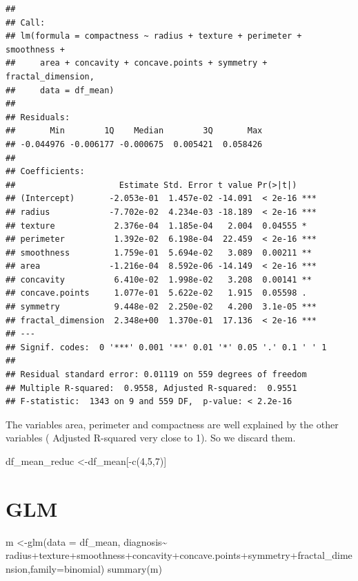 \documentclass[
  11pt,
]{article}
\newenvironment{Shaded}{\begin{snugshade}}{\end{snugshade}}
\newcommand{\AttributeTok}[1]{\textcolor[rgb]{0.77,0.63,0.00}{#1}}
\newcommand{\DecValTok}[1]{\textcolor[rgb]{0.00,0.00,0.81}{#1}}
\newcommand{\FunctionTok}[1]{\textcolor[rgb]{0.00,0.00,0.00}{#1}}
\newcommand{\NormalTok}[1]{#1}
\newcommand{\OtherTok}[1]{\textcolor[rgb]{0.56,0.35,0.01}{#1}}
\newcommand{\SpecialCharTok}[1]{\textcolor[rgb]{0.00,0.00,0.00}{#1}}
\begin{document}
\begin{verbatim}
## 
## Call:
## lm(formula = compactness ~ radius + texture + perimeter + smoothness + 
##     area + concavity + concave.points + symmetry + fractal_dimension, 
##     data = df_mean)
## 
## Residuals:
##       Min        1Q    Median        3Q       Max 
## -0.044976 -0.006177 -0.000675  0.005421  0.058426 
## 
## Coefficients:
##                     Estimate Std. Error t value Pr(>|t|)    
## (Intercept)       -2.053e-01  1.457e-02 -14.091  < 2e-16 ***
## radius            -7.702e-02  4.234e-03 -18.189  < 2e-16 ***
## texture            2.376e-04  1.185e-04   2.004  0.04555 *  
## perimeter          1.392e-02  6.198e-04  22.459  < 2e-16 ***
## smoothness         1.759e-01  5.694e-02   3.089  0.00211 ** 
## area              -1.216e-04  8.592e-06 -14.149  < 2e-16 ***
## concavity          6.410e-02  1.998e-02   3.208  0.00141 ** 
## concave.points     1.077e-01  5.622e-02   1.915  0.05598 .  
## symmetry           9.448e-02  2.250e-02   4.200  3.1e-05 ***
## fractal_dimension  2.348e+00  1.370e-01  17.136  < 2e-16 ***
## ---
## Signif. codes:  0 '***' 0.001 '**' 0.01 '*' 0.05 '.' 0.1 ' ' 1
## 
## Residual standard error: 0.01119 on 559 degrees of freedom
## Multiple R-squared:  0.9558, Adjusted R-squared:  0.9551 
## F-statistic:  1343 on 9 and 559 DF,  p-value: < 2.2e-16
\end{verbatim}

The variables area, perimeter and compactness are well explained by the
other variables ( Adjusted R-squared very close to 1). So we discard
them.

\begin{Shaded}
\begin{Highlighting}[]
\NormalTok{df\_mean\_reduc }\OtherTok{\textless{}{-}}\NormalTok{df\_mean[}\SpecialCharTok{{-}}\FunctionTok{c}\NormalTok{(}\DecValTok{4}\NormalTok{,}\DecValTok{5}\NormalTok{,}\DecValTok{7}\NormalTok{)]}
\end{Highlighting}
\end{Shaded}

\hypertarget{glm}{%
\section{GLM}\label{glm}}

\begin{Shaded}
\begin{Highlighting}[]
\NormalTok{m }\OtherTok{\textless{}{-}}\FunctionTok{glm}\NormalTok{(}\AttributeTok{data =}\NormalTok{ df\_mean, diagnosis}\SpecialCharTok{\textasciitilde{}}\NormalTok{ radius}\SpecialCharTok{+}\NormalTok{texture}\SpecialCharTok{+}\NormalTok{smoothness}\SpecialCharTok{+}\NormalTok{concavity}\SpecialCharTok{+}\NormalTok{concave.points}\SpecialCharTok{+}\NormalTok{symmetry}\SpecialCharTok{+}\NormalTok{fractal\_dimension,}\AttributeTok{family=}\NormalTok{binomial)}
\FunctionTok{summary}\NormalTok{(m)}
\end{Highlighting}
\end{Shaded}
\end{document}
